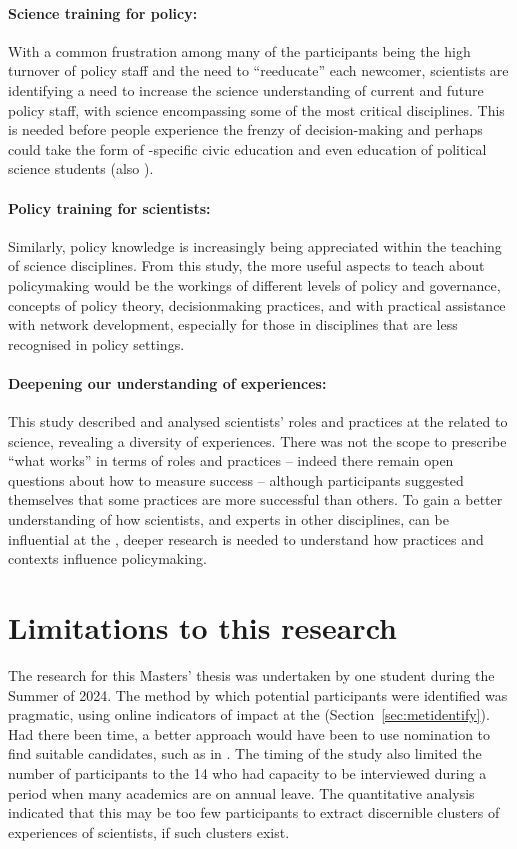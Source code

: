 \paragraph{Science training for policy:}
With a common frustration among many of the participants being the high turnover of policy staff and the need to ``reeducate'' each newcomer, scientists are identifying a need to increase the science understanding of current and future policy staff, with \CAN{} science encompassing some of the most critical disciplines. This is needed before people experience the frenzy of decision-making and perhaps could take the form of \CAN-specific civic education and even education of political science students (also \cite{DykeM2024}).

\paragraph{Policy training for scientists:}
Similarly, policy knowledge is increasingly being appreciated within the teaching of science disciplines. From this study, the more useful aspects to teach about policymaking would be the workings of different levels of policy and governance, concepts of policy theory, decisionmaking practices, and with practical assistance with network development, especially for those in disciplines that are less recognised in policy settings. 

\paragraph{Deepening our understanding of experiences:}
This study described and analysed scientists' roles and practices at the \SPI{} related to \CAN{} science, revealing a diversity of experiences. There was not the scope to prescribe ``what works'' in terms of roles and practices -- indeed there remain open questions about how to measure success -- although participants suggested themselves that some practices are more successful than others. To gain a better understanding of how scientists, and experts in other disciplines, can be influential at the \SPI, deeper research is needed to understand how practices and contexts influence policymaking.

\section{Limitations to this research}
The research for this Masters' thesis was undertaken by one student during the Summer of 2024. The method by which potential participants were identified was pragmatic, using online indicators of impact at the \SPI{} (Section~\ref{sec:metidentify}). Had there been time, a better approach would have been to use nomination to find suitable candidates, such as in \textcite{HaynesDCRHGS2011}. The timing of the study also limited the number of participants to the 14 who had capacity to be interviewed during a period when many academics are on annual leave. The quantitative analysis indicated that this may be too few participants to extract discernible clusters of experiences of scientists, if such clusters exist.

